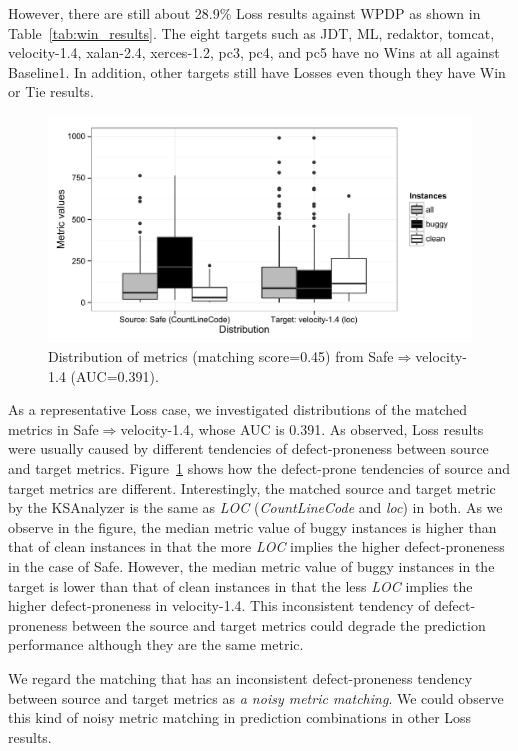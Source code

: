 However, there are still about 28.9\% Loss results against WPDP as shown in Table~\ref{tab:win_results}. The eight targets such as JDT, ML, redaktor, tomcat, velocity-1.4, xalan-2.4,
xerces-1.2, pc3, pc4, and pc5 have no Wins at all against Baseline1. In
addition, other targets still have Losses even though they have Win or Tie
results.


\begin{figure}[t]
	\centering
	\includegraphics[width=\linewidth]{Figures/Result/loss_dist_bplot.pdf}
	\caption{Distribution of metrics (matching score=0.45)
	from Safe$\Rightarrow$velocity-1.4 (AUC=0.391).}
	\label{fig:loss_dist}
\end{figure}


As a representative Loss case, we investigated distributions of the matched metrics in Safe$\Rightarrow$velocity-1.4, whose AUC is 0.391.
As observed, Loss results were usually caused by different tendencies of
defect-proneness between source and target metrics. Figure~\ref{fig:loss_dist}
shows how the defect-prone tendencies of source and target metrics are different.
Interestingly, the matched source and target metric by the KSAnalyzer is the
same as {\em LOC} ({\em CountLineCode} and {\em loc}) in both.
As we observe in the figure, the median metric value of buggy instances is higher than that of clean instances in that the more {\em LOC}
implies the higher defect-proneness in the case of Safe. However, the median metric value of
buggy instances in the target is lower than that of clean instances
in that the less {\em LOC} implies the higher defect-proneness in
velocity-1.4. This inconsistent tendency of
defect-proneness between the source and target metrics could degrade the
prediction performance although they are the same metric.

We regard the matching that has an inconsistent defect-proneness tendency between
source and target metrics as {\em a noisy metric matching}.
We could observe this kind of noisy metric matching in
prediction combinations in other Loss results.

